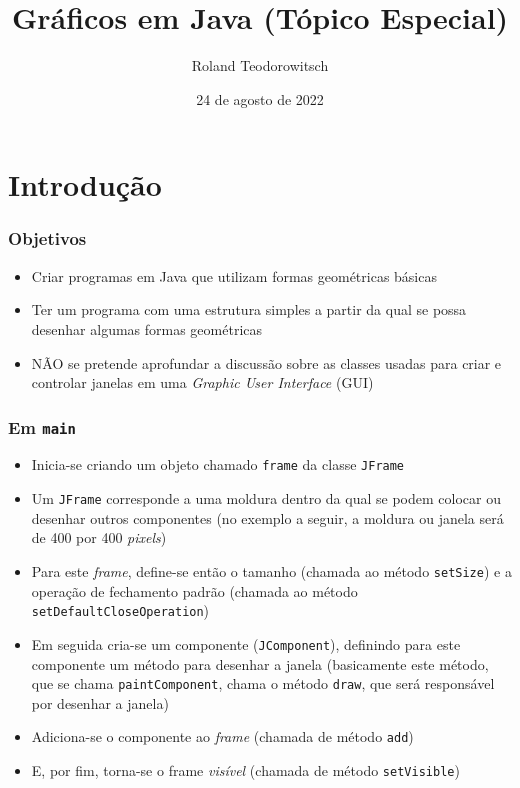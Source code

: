 \documentclass[xcolor={dvipsnames,table},aspectratio=169]{beamer}
\title[\sc{Gráficos em Java (Tópico Especial)}]{Gráficos em Java (Tópico Especial)}
\author[Roland Teodorowitsch]{Roland Teodorowitsch}
\institute[FPROG - EP - PUCRS]{Fundamentos de Programação - Escola Politécnica - PUCRS}
\date{24 de agosto de 2022}
\begin{document}
\justifying

\begin{frame}
	\titlepage
\end{frame}

\section{Introdução}

\begin{frame}\frametitle{Objetivos}
\begin{itemize}
	\item Criar programas em Java que utilizam formas geométricas básicas
	\item Ter um programa com uma estrutura simples a partir da qual se possa desenhar algumas formas geométricas
	\item NÃO se pretende aprofundar a discussão sobre as classes usadas para criar e controlar janelas em uma \emph{Graphic User Interface} (GUI)
\end{itemize}
\end{frame}

\begin{frame}\frametitle{Em \texttt{main}}
\begin{itemize}
	\item Inicia-se criando um objeto chamado \texttt{frame} da classe \texttt{JFrame}
	\item Um \texttt{JFrame} corresponde a uma moldura dentro da qual se podem colocar ou desenhar outros componentes (no exemplo a seguir, a moldura ou janela será de 400 por 400 \emph{pixels})
	\item Para este \emph{frame}, define-se então o tamanho (chamada ao método \texttt{setSize}) e a operação de fechamento padrão (chamada ao método \texttt{setDefaultCloseOperation})
	\item Em seguida cria-se um componente (\texttt{JComponent}), definindo para este componente um método para desenhar a janela (basicamente este método, que se chama \texttt{paintComponent}, chama o método \texttt{draw}, que será responsável por desenhar a janela)
	\item Adiciona-se o componente ao \emph{frame} (chamada de método \texttt{add})
	\item E, por fim, torna-se o frame \emph{visível} (chamada de método \texttt{setVisible})
\end{itemize}
\end{frame}
\end{document}
